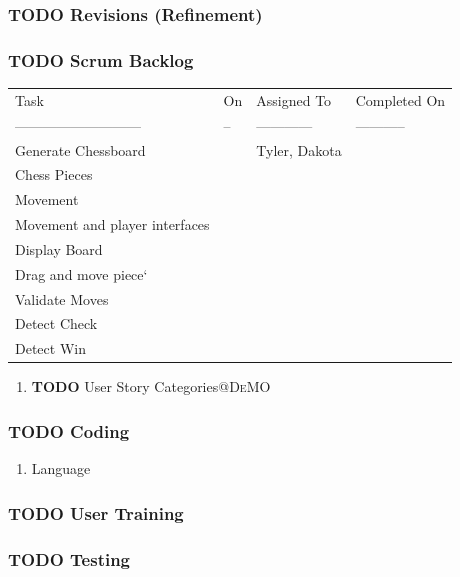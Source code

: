 \documentclass[11pt]{article}
\begin{document}
\subsubsection{{\bfseries\sffamily TODO} Revisions (Refinement)}
\label{sec:org753da99}
\subsubsection{{\bfseries\sffamily TODO} Scrum Backlog}
\label{sec:orgf5bf6e3}
\begin{center}
\begin{tabular}{llll}
Task & On & Assigned To & Completed On\\
--------------------------- & -- & ------------ & -----------\\
Generate Chessboard &  & Tyler, Dakota & \\
Chess Pieces &  &  & \\
Movement &  &  & \\
Movement and player interfaces &  &  & \\
Display Board &  &  & \\
Drag and move piece` &  &  & \\
Validate Moves &  &  & \\
Detect Check &  &  & \\
Detect Win &  &  & \\
\end{tabular}
\end{center}
\begin{enumerate}
\item {\bfseries\sffamily TODO} User Story Categories\hfill{}\textsc{@DeMO}
\label{sec:org3e75f27}
\end{enumerate}
\subsubsection{{\bfseries\sffamily TODO} Coding}
\label{sec:org25e9354}
\begin{enumerate}
\item Language
\label{sec:orgd2b4c32}
\end{enumerate}
\subsubsection{{\bfseries\sffamily TODO} User Training}
\label{sec:org5c70412}
\subsubsection{{\bfseries\sffamily TODO} Testing}
\label{sec:orgf1cad92}
\end{document}
